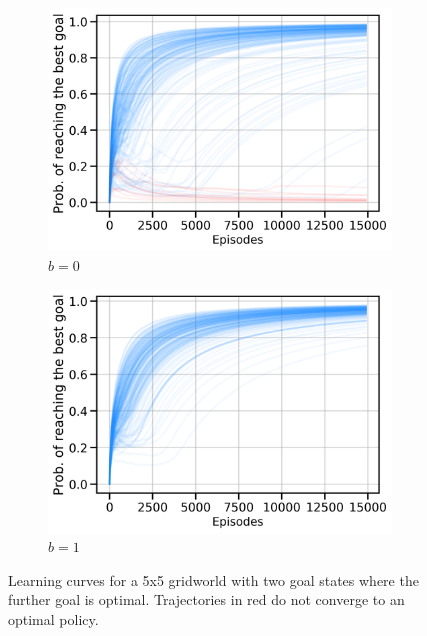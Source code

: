 \begin{figure}[ht]
\begin{subfigure}[b]{0.26\linewidth}
  \end{subfigure}
  \begin{subfigure}[b]{0.26\linewidth}
    \includegraphics[trim={0cm 0cm 0cm
      0},clip,width=\textwidth]{articles/baselines/figs/paper/mdp_baseline=0.png}
    \caption{$b=0$}
    \label{fig:mdp0}
  \end{subfigure}
    \begin{subfigure}[b]{0.26\linewidth}
    \includegraphics[trim={0cm 0cm 0cm
        0},clip,width=\textwidth]{articles/baselines/figs/paper/mdp_baseline=1.png}
    \caption{$b=1$}
    \label{fig:mdp1}
  \end{subfigure}

  \caption{Learning curves for a 5x5 gridworld with two goal states where the further goal is optimal.
  Trajectories in red do not converge to an optimal policy.
  }
  \label{fig:mdp5x5}
\end{figure}


